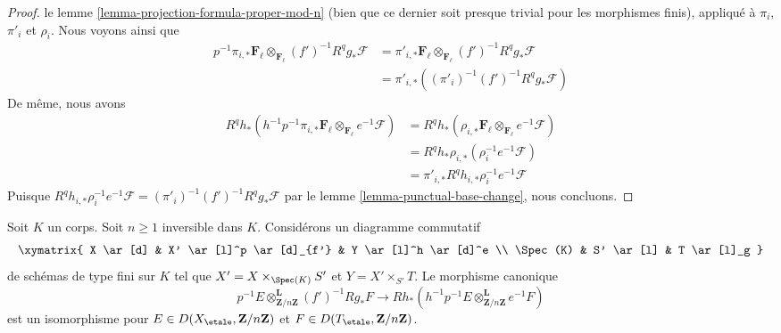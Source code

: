 \begin{proof}
le lemme \ref{lemma-projection-formula-proper-mod-n}
(bien que ce dernier soit presque trivial pour les morphismes finis), appliqué à
$\pi_i$, $\pi'_i$ et $\rho_i$.
Nous voyons ainsi que
\begin{align*}
p^{-1}\pi_{i, *}\mathbf{F}_\ell
\otimes_{\mathbf{F}_\ell} (f')^{-1}R^qg_*\mathcal{F}
& =
\pi'_{i, *}\mathbf{F}_\ell
\otimes_{\mathbf{F}_\ell} (f')^{-1}R^qg_*\mathcal{F} \\
& =
\pi'_{i, *}((\pi'_i)^{-1} (f')^{-1}R^qg_*\mathcal{F})
\end{align*}
De même, nous avons
\begin{align*}
R^qh_*(h^{-1}p^{-1} \pi_{i, *}\mathbf{F}_\ell
\otimes_{\mathbf{F}_\ell} e^{-1}\mathcal{F})
& =
R^qh_*(\rho_{i, *}\mathbf{F}_\ell
\otimes_{\mathbf{F}_\ell} e^{-1}\mathcal{F}) \\
& =
R^qh_*\rho_{i, *}(\rho_i^{-1}e^{-1}\mathcal{F}) \\
& =
\pi'_{i, *}R^qh_{i, *} \rho_i^{-1}e^{-1}\mathcal{F}
\end{align*}
Puisque
$R^qh_{i, *} \rho_i^{-1}e^{-1}\mathcal{F} = 
(\pi'_i)^{-1} (f')^{-1}R^qg_*\mathcal{F}$ par le
lemme \ref{lemma-punctual-base-change},
nous concluons.
\end{proof}

\begin{lemma}
\label{lemma-punctual-base-change-upgrade-unbounded}
Soit $K$ un corps. Soit $n \geq 1$ inversible dans $K$.
Considérons un diagramme commutatif
$$
\xymatrix{
X \ar[d] & X' \ar[l]^p \ar[d]_{f'} & Y \ar[l]^h \ar[d]^e \\
\Spec(K) & S' \ar[l] & T \ar[l]_g
}
$$
de schémas de type fini sur $K$ tel que
$X' = X \times_{\Spec(K)} S'$ et $Y = X' \times_{S'} T$.
Le morphisme canonique
$$
p^{-1}E \otimes_{\mathbf{Z}/n\mathbf{Z}}^\mathbf{L} (f')^{-1}Rg_*F
\longrightarrow
Rh_*(h^{-1}p^{-1}E \otimes_{\mathbf{Z}/n\mathbf{Z}}^\mathbf{L} e^{-1}F)
$$
est un isomorphisme pour $E \in D(X_\etale, \mathbf{Z}/n\mathbf{Z})$
et $F \in D(T_\etale, \mathbf{Z}/n\mathbf{Z})$.
\end{lemma}

